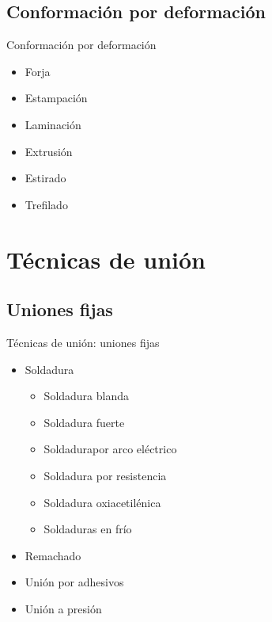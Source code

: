 \documentclass{beamer}
\begin{document}
\subsection{Conformación por deformación}
\begin{frame}{Conformación por deformación}
    \begin{itemize}
        \item Forja
        \item Estampación
        \item Laminación
        \item Extrusión
        \item Estirado
        \item Trefilado
    \end{itemize}
\end{frame}

\section{Técnicas de unión}
\subsection{Uniones fijas}
\begin{frame}{Técnicas de unión: uniones fijas}
    \begin{itemize}
        \item Soldadura
       \begin{itemize}
        \item Soldadura blanda
        \item Soldadura fuerte
        \item Soldadurapor arco eléctrico
        \item Soldadura por resistencia
        \item Soldadura oxiacetilénica
        \item Soldaduras en frío
        \end{itemize}
        \item Remachado
        \item Unión por adhesivos
        \item Unión a presión 

    \end{itemize}
\end{frame}
\end{document}
